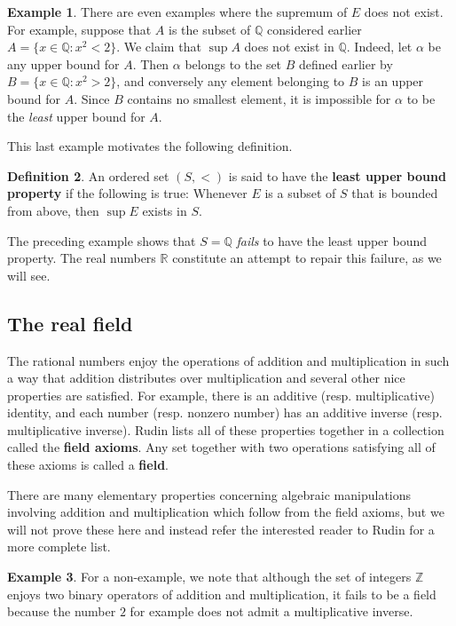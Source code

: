 \documentclass[12pt]{article}
\theoremstyle{definition}
\newtheorem{definition}{Definition}
\newtheorem{example}[definition]{Example}
\theoremstyle{theorem}
\begin{document}
\begin{example}
There are even examples where the supremum of $E$ does not exist. For example, suppose that $A$ is the subset of $\mathbb{Q}$ considered earlier $A = \{x \in \mathbb{Q} : x^2 < 2\}$. We claim that $\sup A$ does not exist in $\mathbb{Q}$. Indeed, let $\alpha$ be any upper bound for $A$. Then $\alpha$ belongs to the set $B$ defined earlier by $B = \{x \in \mathbb{Q} : x^2 > 2\}$, and conversely any element belonging to $B$ is an upper bound for $A$. Since $B$ contains no smallest element, it is impossible for $\alpha$ to be the \emph{least} upper bound for $A$. 
\end{example}

This last example motivates the following definition. 

\begin{definition}
An ordered set $(S, <)$ is said to have the \textbf{least upper bound property} if the following is true: Whenever $E$ is a subset of $S$ that is bounded from above, then $\sup E$ exists in $S$. 
\end{definition}

The preceding example shows that $S = \mathbb{Q}$ \emph{fails} to have the least upper bound property.  The real numbers $\mathbb{R}$ constitute an attempt to repair this failure, as we will see. 

\subsection{The real field}

The rational numbers enjoy the operations of addition and multiplication in such a way that addition distributes over multiplication and several other nice properties are satisfied. For example, there is an additive (resp. multiplicative) identity, and each number (resp. nonzero number) has an additive inverse (resp. multiplicative inverse). Rudin lists all of these properties together in a collection called the \textbf{field axioms}. Any set together with two operations satisfying all of these axioms is called a \textbf{field}. 

There are many elementary properties concerning algebraic manipulations involving addition and multiplication which follow from the field axioms, but we will not prove these here and instead refer the interested reader to Rudin for a more complete list. 

\begin{example}
For a non-example, we note that although the set of integers $\mathbb{Z}$ enjoys two binary operators of addition and multiplication, it fails to be a field because the number $2$ for example does not admit a multiplicative inverse. 
\end{example}
\end{document}
